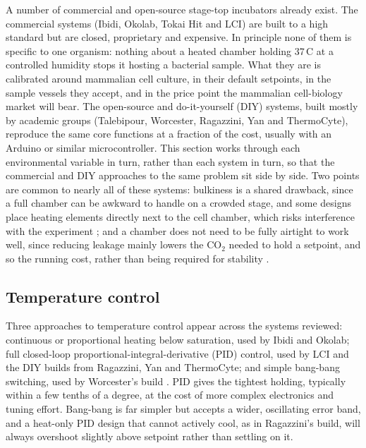 A number of commercial and open-source stage-top incubators already exist. The commercial systems (Ibidi, Okolab, Tokai Hit and LCI) are built to a high standard but are closed, proprietary and expensive. In principle none of them is specific to one organism: nothing about a heated chamber holding 37\,\textdegree{}C at a controlled humidity stops it hosting a bacterial sample. What they are is calibrated around mammalian cell culture, in their default setpoints, in the sample vessels they accept, and in the price point the mammalian cell-biology market will bear. The open-source and do-it-yourself (DIY) systems, built mostly by academic groups (Talebipour, Worcester, Ragazzini, Yan and ThermoCyte), reproduce the same core functions at a fraction of the cost, usually with an Arduino or similar microcontroller. This section works through each environmental variable in turn, rather than each system in turn, so that the commercial and DIY approaches to the same problem sit side by side. Two points are common to nearly all of these systems: bulkiness is a shared drawback, since a full chamber can be awkward to handle on a crowded stage, and some designs place heating elements directly next to the cell chamber, which risks interference with the experiment \citep{talebipour_facilitating_2024}; and a chamber does not need to be fully airtight to work well, since reducing leakage mainly lowers the CO$_2$ needed to hold a setpoint, and so the running cost, rather than being required for stability \citep{talebipour_facilitating_2024}.

\subsection{Temperature control}
\label{subsec:existing-temperature}

Three approaches to temperature control appear across the systems reviewed: continuous or proportional heating below saturation, used by Ibidi and Okolab; full closed-loop proportional-integral-derivative (PID) control, used by LCI and the DIY builds from Ragazzini, Yan and ThermoCyte; and simple bang-bang switching, used by Worcester's build \citep{noauthor_stage_nodate,okolab_stagetop_bl3,noauthor_incubator_2021,ragazzini_fabrication_2019,yan_establishment_2024,ocarroll_thermocyte_nodate,worcester_low-cost_2025}. PID gives the tightest holding, typically within a few tenths of a degree, at the cost of more complex electronics and tuning effort. Bang-bang is far simpler but accepts a wider, oscillating error band, and a heat-only PID design that cannot actively cool, as in Ragazzini's build, will always overshoot slightly above setpoint rather than settling on it.

